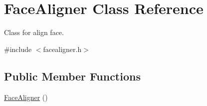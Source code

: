 \hypertarget{class_face_aligner}{\section{Face\+Aligner Class Reference}
\label{class_face_aligner}
}


Class for align face.  




{\ttfamily \#include $<$facealigner.\+h$>$}

\subsection*{Public Member Functions}
\begin{DoxyCompactItemize}
\item 
\hypertarget{class_face_aligner_a1fa7f30e09cbee4cb2fe4c4423b7f919}{\hyperlink{class_face_aligner_a1fa7f30e09cbee4cb2fe4c4423b7f919}{Face\+Aligner} ()}\label{class_face_aligner_a1fa7f30e09cbee4cb2fe4c4423b7f919}


\end{DoxyCompactItemize}
